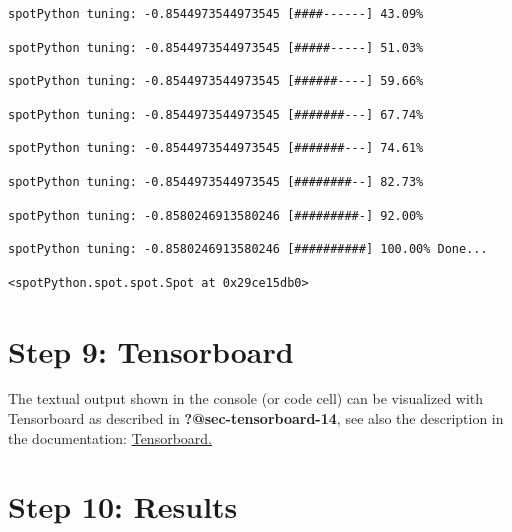 \documentclass[
  letterpaper,
  DIV=11,
  numbers=noendperiod]{scrreprt}
\begin{document}
\begin{verbatim}
spotPython tuning: -0.8544973544973545 [####------] 43.09% 
\end{verbatim}

\begin{verbatim}
spotPython tuning: -0.8544973544973545 [#####-----] 51.03% 
\end{verbatim}

\begin{verbatim}
spotPython tuning: -0.8544973544973545 [######----] 59.66% 
\end{verbatim}

\begin{verbatim}
spotPython tuning: -0.8544973544973545 [#######---] 67.74% 
\end{verbatim}

\begin{verbatim}
spotPython tuning: -0.8544973544973545 [#######---] 74.61% 
\end{verbatim}

\begin{verbatim}
spotPython tuning: -0.8544973544973545 [########--] 82.73% 
\end{verbatim}

\begin{verbatim}
spotPython tuning: -0.8580246913580246 [#########-] 92.00% 
\end{verbatim}

\begin{verbatim}
spotPython tuning: -0.8580246913580246 [##########] 100.00% Done...
\end{verbatim}

\begin{verbatim}
<spotPython.spot.spot.Spot at 0x29ce15db0>
\end{verbatim}

\hypertarget{sec-tensorboard-16}{%
\section{Step 9: Tensorboard}\label{sec-tensorboard-16}}

The textual output shown in the console (or code cell) can be visualized
with Tensorboard as described in \textbf{?@sec-tensorboard-14}, see also
the description in the documentation:
\href{https://sequential-parameter-optimization.github.io/spotPython/14_spot_ray_hpt_torch_cifar10.html\#sec-tensorboard-14}{Tensorboard.}

\hypertarget{sec-results-tuning-16}{%
\section{Step 10: Results}\label{sec-results-tuning-16}}
\end{document}
